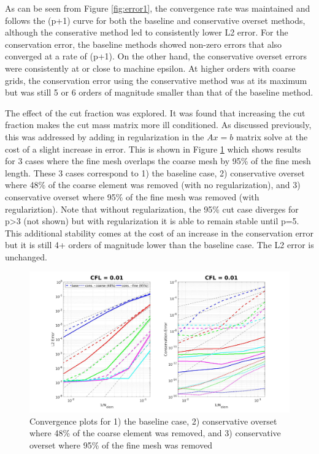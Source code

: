 \documentclass[11pt]{article}
\begin{document}
As can be seen from Figure \ref{fig:error1}, the convergence rate was maintained and 
follows the (p+1) curve for both the baseline and conservative overset methods, although
the conserative method led to consistently lower L2 error. For the conservation error, 
the baseline methods showed non-zero errors that also converged at a rate of (p+1). On
the other hand, the conservative overset errors were consistently at or close to machine epsilon. 
At higher orders with coarse grids, the conservation error using the conservative method was at
its maximum but was still 5 or 6 orders of magnitude smaller than that of the baseline method. 

The effect of the cut fraction was explored. It was found that increasing the cut fraction
makes the cut mass matrix more ill conditioned. As discussed previously, this was addressed
by adding in regularization in the $Ax=b$ matrix solve at the cost of a slight increase
in error. This is shown in Figure \ref{fig:reg} which shows results for 3 cases
where the fine mesh overlaps the coarse mesh by 95\% of the fine mesh length. These 3
cases correspond to 1) the baseline case, 2) conservative overset where 48\% of the coarse element 
was removed (with no regularization), and 3) conservative overset where 95\% of the fine mesh was removed (with
regulariztion). Note that without regularization, the 95\% cut case diverges for p>3 (not shown) but with regularization it is able to 
remain stable until p=5. This additional stability comes at the cost of an increase in the conservation
error but it is still 4+ orders of magnitude lower than the baseline case. The L2 error is unchanged. 

\begin{figure}
\centering
  \includegraphics[width=\textwidth]{Figures/Convergence_Legendre_CFL0p01_CutLength.jpg}
  \caption{Convergence plots for 1) the baseline case, 2) conservative overset where 48\% of the coarse element was removed, and 3) conservative overset where 95\% of the fine mesh was removed}
  \label{fig:reg}
\end{figure}
\end{document}

